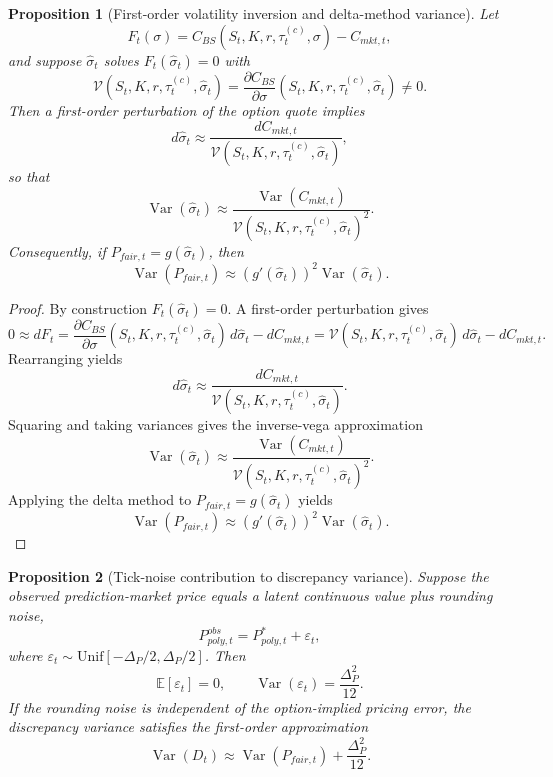 \documentclass[11pt]{article}
\numberwithin{equation}{section}
\theoremstyle{plain}
\newtheorem{proposition}{Proposition}[section]
\begin{document}
\begin{proposition}[First-order volatility inversion and delta-method variance]
\label{prop:iv-delta}
Let
\[
F_t(\sigma)=C_{BS}(S_t,K,r,\tau_t^{(c)},\sigma)-C_{mkt,t},
\]
and suppose $\hat{\sigma}_t$ solves $F_t(\hat{\sigma}_t)=0$ with
\[
\mathcal{V}(S_t,K,r,\tau_t^{(c)},\hat{\sigma}_t)
=
\frac{\partial C_{BS}}{\partial \sigma}(S_t,K,r,\tau_t^{(c)},\hat{\sigma}_t)\neq 0.
\]
Then a first-order perturbation of the option quote implies
\[
d\hat{\sigma}_t
\approx
\frac{dC_{mkt,t}}{\mathcal{V}(S_t,K,r,\tau_t^{(c)},\hat{\sigma}_t)},
\]
so that
\[
\operatorname{Var}(\hat{\sigma}_t)
\approx
\frac{\operatorname{Var}(C_{mkt,t})}
{\mathcal{V}(S_t,K,r,\tau_t^{(c)},\hat{\sigma}_t)^2}.
\]
Consequently, if $P_{fair,t}=g(\hat{\sigma}_t)$, then
\[
\operatorname{Var}(P_{fair,t})
\approx
\left(g'(\hat{\sigma}_t)\right)^2
\operatorname{Var}(\hat{\sigma}_t).
\]
\end{proposition}

\begin{proof}
By construction $F_t(\hat{\sigma}_t)=0$. A first-order perturbation gives
\[
0\approx dF_t
=
\frac{\partial C_{BS}}{\partial \sigma}(S_t,K,r,\tau_t^{(c)},\hat{\sigma}_t)\,d\hat{\sigma}_t-dC_{mkt,t}
=
\mathcal{V}(S_t,K,r,\tau_t^{(c)},\hat{\sigma}_t)\,d\hat{\sigma}_t-dC_{mkt,t}.
\]
Rearranging yields
\[
d\hat{\sigma}_t\approx \frac{dC_{mkt,t}}{\mathcal{V}(S_t,K,r,\tau_t^{(c)},\hat{\sigma}_t)}.
\]
Squaring and taking variances gives the inverse-vega approximation
\[
\operatorname{Var}(\hat{\sigma}_t)
\approx
\frac{\operatorname{Var}(C_{mkt,t})}
{\mathcal{V}(S_t,K,r,\tau_t^{(c)},\hat{\sigma}_t)^2}.
\]
Applying the delta method to $P_{fair,t}=g(\hat{\sigma}_t)$ yields
\[
\operatorname{Var}(P_{fair,t})
\approx
\left(g'(\hat{\sigma}_t)\right)^2\operatorname{Var}(\hat{\sigma}_t).
\]
\end{proof}

\begin{proposition}[Tick-noise contribution to discrepancy variance]
\label{prop:tick-noise}
Suppose the observed prediction-market price equals a latent continuous value plus rounding noise,
\[
P_{poly,t}^{obs}=P_{poly,t}^{\ast}+\varepsilon_t,
\]
where $\varepsilon_t\sim \mathrm{Unif}[-\Delta_P/2,\Delta_P/2]$. Then
\[
\mathbb{E}[\varepsilon_t]=0,
\qquad
\operatorname{Var}(\varepsilon_t)=\frac{\Delta_P^2}{12}.
\]
If the rounding noise is independent of the option-implied pricing error, the discrepancy variance satisfies the first-order approximation
\[
\operatorname{Var}(D_t)
\approx
\operatorname{Var}(P_{fair,t})+\frac{\Delta_P^2}{12}.
\]
\end{proposition}
\end{document}
